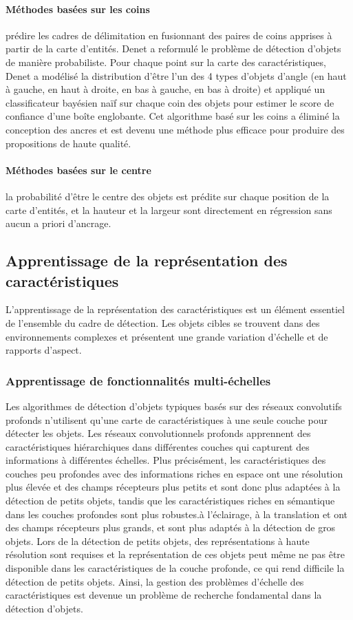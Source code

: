           \paragraph{Méthodes basées sur les coins} prédire les cadres de délimitation en fusionnant des paires de coins apprises à partir de la carte d'entités. Denet \cite{denet_paper} a reformulé le problème de détection d'objets de manière probabiliste. Pour chaque point sur la carte des caractéristiques, Denet a modélisé la distribution d'être l'un des 4 types d'objets d'angle (en haut à gauche, en haut à droite, en bas à gauche, en bas à droite) et appliqué un classificateur bayésien naïf sur chaque coin des objets pour estimer le score de confiance d'une boîte englobante. Cet algorithme basé sur les coins a éliminé la conception des ancres et est devenu une méthode plus efficace pour produire des propositions de haute qualité.
          \paragraph{Méthodes basées sur le centre} la probabilité d'être le centre des objets est prédite sur chaque position de la carte d'entités, et la hauteur et la largeur sont directement en régression sans aucun a priori d'ancrage.
     \subsection{Apprentissage de la représentation des caractéristiques}
     L'apprentissage de la représentation des caractéristiques est un élément essentiel de l'ensemble du cadre de détection. Les objets cibles se trouvent dans des environnements complexes et présentent une grande variation d'échelle et de rapports d'aspect.
     
     \subsubsection{Apprentissage de fonctionnalités multi-échelles}
     Les algorithmes de détection d'objets typiques basés sur des réseaux convolutifs profonds n'utilisent qu'une carte de caractéristiques à une seule couche pour détecter les objets. Les réseaux convolutionnels profonds apprennent des caractéristiques hiérarchiques dans différentes couches qui capturent des informations à différentes échelles. Plus précisément, les caractéristiques des couches peu profondes avec des informations riches en espace ont une résolution plus élevée et des champs récepteurs plus petits et sont donc plus adaptées à la détection de petits objets, tandis que les caractéristiques riches en sémantique dans les couches profondes sont plus robustes.à l'éclairage, à la translation et ont des champs récepteurs plus grands, et sont plus adaptés à la détection de gros objets. Lors de la détection de petits objets, des représentations à haute résolution sont requises et la représentation de ces objets peut même ne pas être disponible dans les caractéristiques de la couche profonde, ce qui rend difficile la détection de petits objets. Ainsi, la gestion des problèmes d'échelle des caractéristiques est devenue un problème de recherche fondamental dans la détection d'objets.
